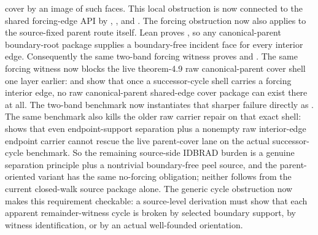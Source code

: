 \documentclass[11pt]{article}
\begin{document}
cover by an image of such faces.  This local obstruction is now connected to
the shared forcing-edge API by
,
, and
.
The forcing obstruction now also applies to the source-fixed parent route
itself.  Lean proves
,
so any canonical-parent boundary-root package supplies a boundary-free
incident face for every interior edge.  Consequently the same two-band forcing
witness proves
and
.
The same forcing witness now blocks the live theorem-4.9 raw canonical-parent
cover shell one layer earlier:
and
show that once a successor-cycle shell carries a forcing interior edge, no raw
canonical-parent shared-edge cover package can exist there at all.
The two-band benchmark now instantiates that sharper failure directly as
.
The same benchmark also kills the older raw carrier repair on that exact
shell:
shows that even endpoint-support separation plus a nonempty raw interior-edge
endpoint carrier cannot rescue the live parent-cover lane on the actual
successor-cycle benchmark.
So the remaining source-side IDBRAD burden is a genuine separation principle
plus a nontrivial boundary-free peel source, and the parent-oriented variant
has the same no-forcing obligation; neither follows from the current
closed-walk source package alone.
The generic cycle
obstruction now makes this requirement checkable: a source-level derivation must
show that each apparent remainder-witness cycle is broken by selected boundary
support, by witness identification, or by an actual well-founded orientation.
\end{document}
